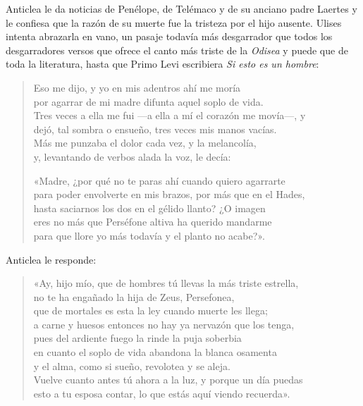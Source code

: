 \documentclass[11pt,a4paper]{article}
\begin{document}
Anticlea le da noticias de Penélope, de Telémaco y de su anciano padre Laertes y le confiesa que la razón de su muerte fue la tristeza por el hijo ausente. Ulises intenta abrazarla en vano, un pasaje todavía más desgarrador que todos los desgarradores versos que ofrece el canto más triste de la \emph{Odisea} y puede que de toda la literatura, hasta que Primo Levi escribiera \emph{Si esto es un hombre}:

\begin{verse}
Eso me dijo, y yo en mis adentros ahí me moría\\
por agarrar de mi madre difunta aquel soplo de vida.\\
Tres veces a ella me fui ---a ella a mí el corazón me movía---, y\\
dejó, tal sombra o ensueño, tres veces mis manos vacías.\\
Más me punzaba el dolor cada vez, y la melancolía,\\
y, levantando de verbos alada la voz, le decía:

«Madre, ¿por qué no te paras ahí cuando quiero agarrarte\\
para poder envolverte en mis brazos, por más que en el Hades,\\
hasta saciarnos los dos en el gélido llanto? ¿O imagen\\
eres no más que Perséfone altiva ha querido mandarme\\
para que llore yo más todavía y el planto no acabe?».
\end{verse}

Anticlea le responde:

\begin{verse}
«Ay, hijo mío, que de hombres tú llevas la más triste estrella,\\
no te ha engañado la hija de Zeus, Persefonea,\\
que de mortales es esta la ley cuando muerte les llega;\\
a carne y huesos entonces no hay ya nervazón que los tenga,\\
pues del ardiente fuego la rinde la puja soberbia\\
en cuanto el soplo de vida abandona la blanca osamenta\\
y el alma, como si sueño, revolotea y se aleja.\\
Vuelve cuanto antes tú ahora a la luz, y porque un día puedas\\
esto a tu esposa contar, lo que estás aquí viendo recuerda».
\end{verse}
\end{document}

